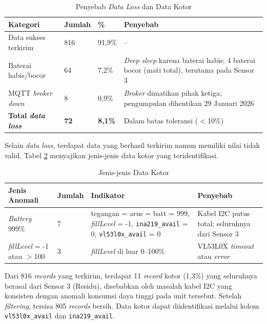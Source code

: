 \begin{table}[H]
  \caption{Penyebab \textit{Data Loss} dan Data Kotor}
  \label{tab:analisis-dataloss}
  \begin{tabularx}{\textwidth}{| X | l | l | X |}
    \hline
    \textbf{Kategori} & \textbf{Jumlah} & \textbf{\%} & \textbf{Penyebab} \\
    \hline
    Data sukses terkirim & 816 & 91,9\% & -- \\
    \hline
    Baterai habis/bocor & 64 & 7,2\% & \textit{Deep sleep} karena baterai habis; 4 baterai bocor (mati total), terutama pada Sensor 3 \\
    \hline
    MQTT \textit{broker} \textit{down} & 8 & 0,9\% & \textit{Broker} dimatikan pihak ketiga; pengumpulan dihentikan 29 Januari 2026 \\
    \hline
    \textbf{Total \textit{data loss}} & \textbf{72} & \textbf{8,1\%} & Dalam batas toleransi ($<$10\%) \\
    \hline
  \end{tabularx}
\end{table}

Selain \textit{data loss}, terdapat data yang berhasil terkirim namun memiliki nilai tidak valid. Tabel \ref{tab:jenis-data-kotor} menyajikan jenis-jenis data kotor yang teridentifikasi.

\begin{table}[H]
  \caption{Jenis-jenis Data Kotor}
  \label{tab:jenis-data-kotor}
  \begin{tabularx}{\textwidth}{| l | l | X | X |}
    \hline
    \textbf{Jenis Anomali} & \textbf{Jumlah} & \textbf{Indikator} & \textbf{Penyebab} \\
    \hline
    \textit{Battery} 999\% & 7 & tegangan = arus = batt = 999, \textit{fillLevel} = -1, \texttt{ina219\_avail} = 0, \texttt{vl53l0x\_avail} = 0 & Kabel I2C putus total; seluruhnya dari Sensor 3 \\
    \hline
    \textit{fillLevel} = -1 atau $>$100 & 3 & \textit{fillLevel} di luar 0--100\% & VL53L0X \textit{timeout} atau \textit{error} \\
    \hline
  \end{tabularx}
\end{table}

Dari 816 \textit{records} yang terkirim, terdapat 11 \textit{record} kotor (1,3\%) yang seluruhnya berasal dari Sensor 3 (Residu), disebabkan oleh masalah kabel I2C yang konsisten dengan anomali konsumsi daya tinggi pada unit tersebut. Setelah \textit{filtering}, tersisa 805 \textit{records} bersih. Data kotor dapat diidentifikasi melalui kolom \texttt{vl53l0x\_avail} dan \texttt{ina219\_avail}.

